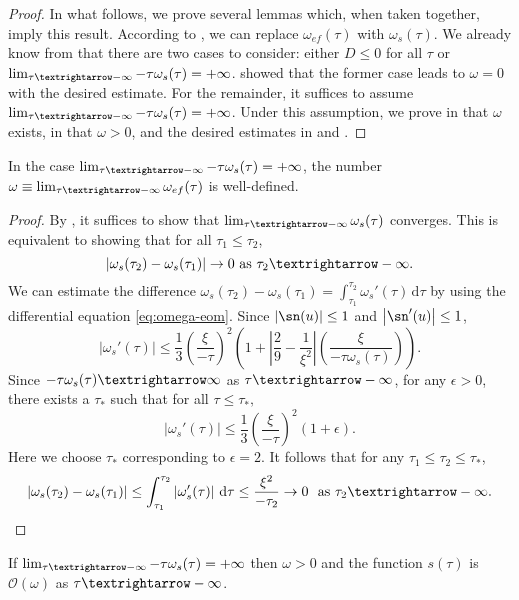 \begin{proof}
In what follows, we prove several lemmas which, when taken together, imply this result. According to , we can replace $\omega_{ef}(\tau)$ with $\omega_{s}(\tau)$. We already know from  that there are two cases to consider: either $D\leq0$ for all $\tau$ or $\lim_{\tau\textrightarrow-\infty}-\tau\omega_{s}(\tau)=+\infty$.  showed that the former case leads to $\omega=0$ with the desired estimate. For the remainder, it suffices to assume $\lim_{\tau\textrightarrow-\infty}-\tau\omega_{s}(\tau)=+\infty$. Under this assumption, we prove in  that $\omega$ exists, in  that $\omega>0$, and the desired estimates in  and . 
\end{proof}
%
\begin{lem}
\label{lem:ws-limit-exists}In the case $\lim_{\tau\textrightarrow-\infty}-\tau\omega_{s}(\tau)=+\infty$, the number $\omega\equiv\lim_{\tau\textrightarrow-\infty}\omega_{ef}(\tau)$ is well-defined.
\end{lem}

\begin{proof}
By , it suffices to show that $\lim_{\tau\textrightarrow-\infty}\omega_{s}(\tau)$ converges. This is equivalent to showing that for all $\tau_{1}\leq\tau_{2}$, 
\[
\left|\omega_{s}(\tau_{2})-\omega_{s}(\tau_{1})\right|\to0\textrm{ as }\tau_{2}\textrightarrow-\infty.
\]
 We can estimate the difference $\omega_{s}(\tau_{2})-\omega_{s}(\tau_{1})=\int_{\tau_{1}}^{\tau_{2}}\omega_{s}'(\tau)\,\mathrm{d}\tau$ by using the differential equation \eqref{eq:omega-eom}. Since $\left|\sn(u)\right|\leq1$ and $\left|\sn'(u)\right|\leq1$, 
\[
\left|\omega_{s}'(\tau)\right|\leq\frac{1}{3}\left(\frac{\xi}{-\tau}\right)^{2}\left(1+\left|\frac{2}{9}-\frac{1}{\xi^{2}}\right|\left(\frac{\xi}{-\tau\omega_{s}(\tau)}\right)\right).
\]
 Since $-\tau\omega_{s}(\tau)\textrightarrow\infty$ as $\tau\textrightarrow-\infty$, for any $\epsilon>0$, there exists a $\tau_{*}$ such that for all $\tau\leq\tau_{*},$ 
\[
\left|\omega_{s}'(\tau)\right|\leq\frac{1}{3}\left(\frac{\xi}{-\tau}\right)^{2}\left(1+\epsilon\right).
\]
 Here we choose $\tau_{*}$ corresponding to $\epsilon=2$. It follows that for any $\tau_{1}\leq\tau_{2}\leq\tau_{*}$, 
\[
\left|\omega_{s}(\tau_{2})-\omega_{s}(\tau_{1})\right|\leq\int_{\tau_{1}}^{\tau_{2}}\left|\omega_{s}'(\tau)\right|\,\mathrm{d}\tau\leq\frac{\xi^{2}}{-\tau_{2}}\to0\ \textrm{ as }\ensuremath{\tau_{2}\textrightarrow-\infty}.
\]
\end{proof}
\begin{lem}
\label{lem:omega-positive}If $\lim_{\tau\textrightarrow-\infty}-\tau\omega_{s}(\tau)=+\infty$ then $\omega>0$ and the function $s(\tau)$ is $\mathcal{O}(\omega)$ as $\tau\textrightarrow-\infty$. 
\end{lem}

